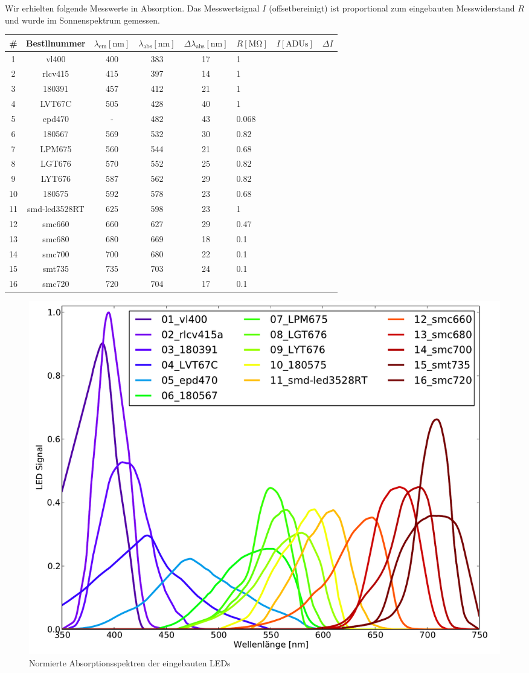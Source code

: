 \documentclass[a4paper, 12pt]{scrartcl}
\begin{document}
Wir erhielten folgende Messwerte in Absorption.
Das Messwertsignal $I$ (offsetbereinigt) ist proportional zum eingebauten Messwiderstand $R$ und wurde im Sonnenspektrum gemessen.

{\centering
\begin{tabular}{c|c|c|c|c|l|c|c}
\# &
Bestllnummer &
$\lambda_\text{em} [\mathrm{nm}]$ &
$\lambda_\text{abs} [\mathrm{nm}]$ &
$\Delta\lambda_\text{abs} [\mathrm{nm}]$ &
$R [\mathrm{M\Omega}]$ &
$I [\text{ADUs}]$ &
$\Delta I$\\
\hline
1 & vl400 & 400 & 383 & 17 & 1\\
2 & rlcv415 & 415 & 397 & 14 & 1\\
3 & 180391 & 457 & 412 & 21 & 1\\
4 & LVT67C & 505 & 428 & 40 & 1\\
5 & epd470 & - & 482 & 43 & 0.068\\
6 & 180567 & 569 & 532 & 30 & 0.82\\
7 & LPM675 & 560 & 544 & 21 & 0.68\\
8 & LGT676 & 570 & 552 & 25 & 0.82\\
9 & LYT676 & 587 & 562 & 29 & 0.82\\
10 & 180575 & 592 & 578 & 23 & 0.68\\
11 & smd-led3528RT & 625 & 598 & 23 & 1\\
12 & smc660 & 660 & 627 & 29 & 0.47\\
13 & smc680 & 680 & 669 & 18 & 0.1\\
14 & smc700 & 700 & 680 & 22 & 0.1\\
15 & smt735 & 735 & 703 & 24 & 0.1\\
16 & smc720 & 720 & 704 & 17 & 0.1\\
\end{tabular}}

\begin{figure}[ht]
\centering
\includegraphics[width=\textwidth]{images/spektren.pdf}
\caption{Normierte Absorptionsspektren der eingebauten LEDs}
\end{figure}
\end{document}
